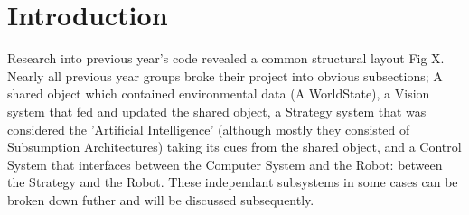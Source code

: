 \section{Introduction}



Research into previous year's code revealed a common structural layout Fig X. 
Nearly all previous year groups broke their project into obvious subsections; 
A shared object which contained environmental data (A WorldState), a Vision 
system that fed and updated the shared object, a Strategy system that was 
considered the 'Artificial Intelligence' (although mostly they consisted of 
Subsumption Architectures) taking its cues from the shared object, and a Control 
System that interfaces between the Computer System and the Robot: between the 
Strategy and the Robot. These independant subsystems in some cases can be broken 
down futher and will be discussed subsequently. 
